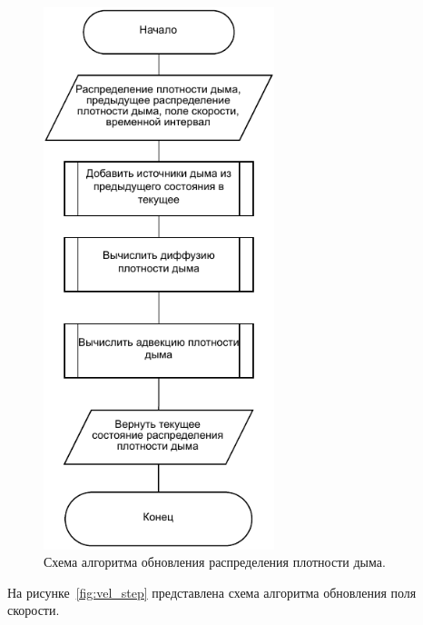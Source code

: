 \begin{figure}[H]
	\centering
	\includegraphics[width=0.6\textwidth, page=1]{assets/img/dens_step.pdf}   
	\caption{Схема алгоритма обновления распределения плотности дыма.}
	\label{fig:dens_step}
\end{figure}

На рисунке~\ref{fig:vel_step} представлена схема алгоритма обновления поля скорости.

